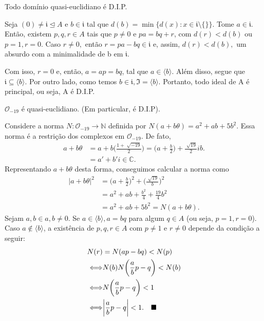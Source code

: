 \documentclass[AlgebraII/algebraII_notes.tex]{subfiles}
\begin{document}
\begin{lemma*}
	Todo domínio quasi-euclidiano é D.I.P.
\end{lemma*}
\begin{proof*}
	Seja \((0)\neq \mathfrak{i}\trianglelefteq{A}\) e \(b\in \mathfrak{i}\) tal que \(d(b) = \min\{d(x):x\in \mathfrak{i}\setminus{\{\}}\}\).
	Tome \(a\in \mathfrak{i}.\) Então, existem \(p, q, r\in A\) tais que \(p\neq 0\) e \(pa = bq + r\), com \(d(r) < d(b)\) ou \(p=1, r=0.\)
	Caso \(r\neq 0,\) então \(r = pa-bq\in \mathfrak{i}\) e, assim, \(d(r) < d(b),\) um absurdo com a minimalidade de b em \(\mathfrak{i}.\)

	Com isso, \(r=0\) e, então, \(a = ap = bq\), tal que \(a\in \langle b \rangle.\) Além disso, segue que \(\mathfrak{i}\subseteq{\langle b \rangle}.\)
	Por outro lado, como temos \(b\in \mathfrak{i}, \mathfrak{I} = \langle b \rangle\). Portanto, todo ideal de A é principal, ou seja, A é D.I.P. \qedsymbol
\end{proof*}
\begin{theorem*}
	\(\mathcal{O}_{-19}\) é quasi-euclidiano. (Em particular, é D.I.P).
\end{theorem*}
\begin{proof*}
	Considere a norma \(N:\mathcal{O}_{-19}\rightarrow \mathbb{N}\) definida por \(N(a+b\theta ) = a^{2} + ab + 5b^{2}.\) Essa norma é a
	restrição dos complexos em \(\mathcal{O}_{-19}.\) De fato,
	\begin{align*}
		a + b\theta & = a +b \biggl(\frac{1+\sqrt[]{-19}}{2}\biggr) = \biggl(a + \frac{b}{2}\biggr) + \frac{\sqrt[]{19}}{2}ib. \\
		            & = a' + b'i\in \mathbb{C}.
	\end{align*}
	Representando \(a + b\theta \) desta forma, conseguimos calcular a norma como
	\begin{align*}
		|a+b\theta |^{2} & = \biggl(a + \frac{b}{2}\biggr)^{2} + \biggl(\frac{\sqrt[]{19}}{b}\biggr)^{2} \\
		                 & = a^{2} + ab + \frac{b^{2}}{4} + \frac{19}{4}b^{2}                            \\
		                 & = a^{2} + ab + 5b^{2} = N(a + b\theta ).
	\end{align*}
	Sejam \(a, b\in a, b\neq0.\) Se \(a\in \langle b \rangle, a = bq\) para algum \(q\in A\) (ou seja, \(p=1, r = 0\)).
	Caso \(a\not\in \langle b \rangle\), a existência de \(p, q, r\in A\) com \(p\neq 1\) e \(r\neq 0\) depende da condição
	a seguir:
	\begin{align*}
		N(r)                & = N(ap-bq) < N(p)                                          \\
		\Longleftrightarrow & N(b)N \biggl(\frac{a}{b}p - q\biggr) < N(b)                \\
		\Longleftrightarrow & N \biggl(\frac{a}{b}p - q\biggr) < 1                       \\
		\Longleftrightarrow & \biggl|\frac{a}{b}p - q\biggr| < 1. \quad\text{$\blacksquare$}
	\end{align*}
\end{proof*}
\end{document}

